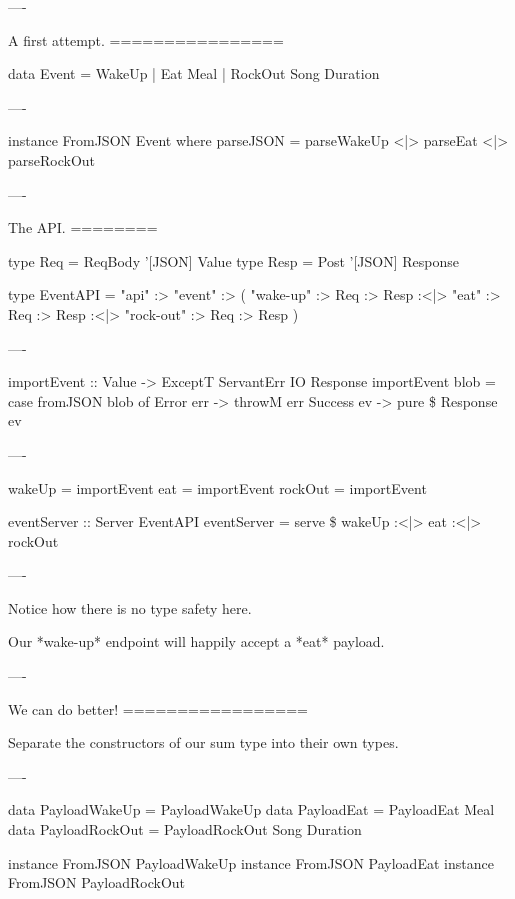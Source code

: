 ----

A first attempt.
================

\begin{hs}
  data Event = WakeUp
             | Eat     Meal
             | RockOut Song Duration
\end{hs}

----

\begin{hs}
  instance FromJSON Event where
    parseJSON = parseWakeUp
            <|> parseEat
            <|> parseRockOut
\end{hs}

----

The API.
========

\begin{hs}
  type Req  = ReqBody '[JSON] Value
  type Resp = Post    '[JSON] Response

  type EventAPI =
    "api" :> "event" :>
               ( "wake-up"  :> Req :> Resp
            :<|> "eat"      :> Req :> Resp
            :<|> "rock-out" :> Req :> Resp
               )
\end{hs}

----

\begin{hs}
  importEvent :: Value -> ExceptT ServantErr IO Response
  importEvent blob =
    case fromJSON blob of
      Error   err -> throwM err
      Success ev  -> pure \$ Response ev
\end{hs}

----

\begin{hs}
  wakeUp  = importEvent
  eat     = importEvent
  rockOut = importEvent

  eventServer :: Server EventAPI
  eventServer = serve \$
    wakeUp :<|> eat :<|> rockOut
\end{hs}

----

Notice how there is no type safety here.

Our *wake-up* endpoint will happily accept a *eat* payload.

----

We can do better!
=================

Separate the constructors of our sum type into their own types.

----

\begin{hs}
  data PayloadWakeUp  = PayloadWakeUp
  data PayloadEat     = PayloadEat     Meal
  data PayloadRockOut = PayloadRockOut Song Duration

  instance FromJSON PayloadWakeUp
  instance FromJSON PayloadEat
  instance FromJSON PayloadRockOut
\end{hs}

